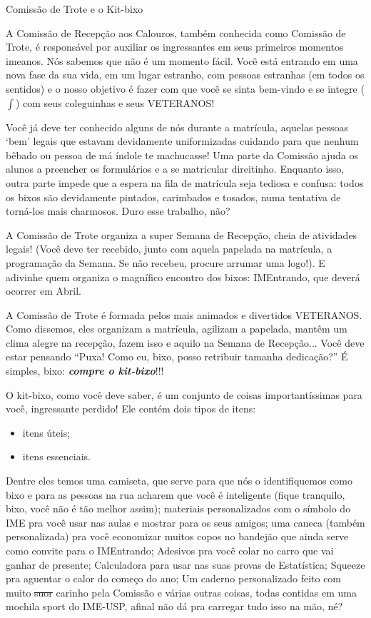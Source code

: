 \begin{secao}{Comissão de Trote e o Kit-bixo}

A Comissão de Recepção aos Calouros, também conhecida como Comissão de Trote,
é responsável por auxiliar os ingressantes em seus primeiros momentos imeanos.
Nós sabemos que não é um momento fácil. Você está entrando em uma nova fase da
sua vida, em um lugar estranho, com pessoas estranhas (em todos os sentidos) e
o nosso objetivo é fazer com que você se sinta bem-vindo e se integre ($\int$)
com seus coleguinhas e seus VETERANOS!

Você já deve ter conhecido alguns de nós durante a matrícula, aquelas pessoas
`bem' legais que estavam devidamente uniformizadas cuidando para que nenhum
bêbado ou pessoa de má índole te machucasse! Uma parte da Comissão ajuda os
alunos a preencher os formulários e a se matricular direitinho. Enquanto isso,
outra parte impede que a espera na fila de matrícula seja tediosa e confusa:
todos os bixos são devidamente pintados, carimbados e tosados, numa tentativa
de torná-los mais charmosos. Duro esse trabalho, não?

A Comissão de Trote organiza a super Semana de Recepção, cheia de atividades
legais! (Você deve ter recebido, junto com aquela papelada na matrícula, a
programação da Semana. Se não recebeu, procure arrumar uma logo!).
E adivinhe quem organiza o magnífico encontro dos bixos: IMEntrando, que deverá
ocorrer em Abril. %

A Comissão de Trote é formada pelos mais animados e divertidos VETERANOS. Como
dissemos, eles organizam a matrícula, agilizam a papelada, mantêm um clima
alegre na recepção, fazem isso e aquilo na Semana de Recepção...
Você deve estar pensando ``Puxa! Como eu, bixo, posso retribuir
tamanha dedicação?'' É simples, bixo: {\bf\em compre o kit-bixo}!!!

O kit-bixo, como você deve saber, é um conjunto de coisas importantíssimas
para você, ingressante perdido! Ele contém dois tipos de itens:
\begin{itemize}
\item itens úteis;
\item itens essenciais. 
\end{itemize}
Dentre eles temos uma camiseta, que serve para que
nós o identifiquemos como bixo e para as pessoas na rua acharem que você é
inteligente (fique tranquilo, bixo, você não é tão melhor assim);
 materiais personalizados com o símbolo do IME pra você usar nas aulas e mostrar para os seus amigos;
 uma caneca (também personalizada) pra você economizar muitos copos no bandejão
que ainda serve como convite para o IMEntrando;
 Adesivos pra você colar no carro que vai ganhar de presente;
 Calculadora para usar nas suas provas de Estatística;
 Squeeze pra aguentar o calor do começo do ano;
 Um caderno personalizado feito com muito \sout{suor} carinho pela Comissão e
 várias outras coisas, todas contidas em uma mochila sport do IME-USP, afinal
 não dá pra carregar tudo isso na mão, né?


\end{secao}
